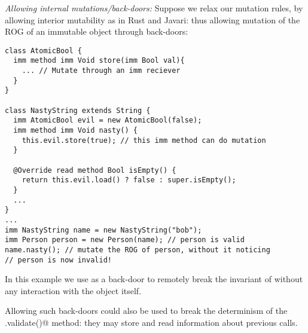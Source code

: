 \loseSpace
\noindent\textit{Allowing internal mutations/back-doors:}
Suppose we relax our mutation rules, by allowing interior mutability
as in Rust and Javari: thus allowing mutation of the ROG of an immutable object through back-doors:
\begin{lstlisting}
class AtomicBool {
  imm method imm Void store(imm Bool val){
    ... // Mutate through an imm reciever
  }
}

class NastyString extends String {
  imm AtomicBool evil = new AtomicBool(false);
  imm method imm Void nasty() {
    this.evil.store(true); // this imm method can do mutation
  }

  @Override read method Bool isEmpty() {
    return this.evil.load() ? false : super.isEmpty();
  }
  ...
}
...
imm NastyString name = new NastyString("bob");
imm Person person = new Person(name); // person is valid
name.nasty(); // mutate the ROG of person, without it noticing
// person is now invalid!
\end{lstlisting}

In this example we use \Q@AtomicBool@ as a back-door to remotely break the invariant of \Q@person@ without any interaction with the \Q@person@ object itself.


Allowing such back-doors could also be used to break the determinism of the \Q@.validate()@ method: they may store and read information about previous calls.

